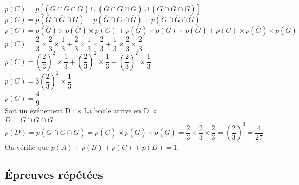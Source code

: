 $ p\left(C\right) = p\left[\left( \overline{G} \cap  \overline{G} \cap G \right) \cup \left( \overline{G} \cap G \cap \overline{G} \right) \cup \left( G \cap \overline{G} \cap \overline{G} \right)\right] $ \\

$ p\left(C\right) = p\left(\overline{G} \cap  \overline{G} \cap G \right) + p\left( \overline{G} \cap G \cap \overline{G} \right) + p\left( G \cap \overline{G} \cap \overline{G} \right) $ \\

$ p\left(C\right) = p\left(\overline{G}\right) \times p\left(\overline{G}\right) \times p\left(G\right) + p\left(\overline{G}\right) \times p\left(G\right) \times p\left(\overline{G}\right) + p\left(G\right) \times p\left(\overline{G}\right) \times p\left(\overline{G}\right) $ \\

$ p\left(C\right) = \dfrac{2}{3} \times \dfrac{2}{3} \times \dfrac{1}{3} +  \dfrac{2}{3} \times \dfrac{1}{3} \times \dfrac{2}{3} +  \dfrac{1}{3} \times \dfrac{2}{3} \times \dfrac{2}{3} $ \\

$ p\left(C\right) = \left(\dfrac{2}{3}\right)^2 \times \dfrac{1}{3} +  \left(\dfrac{2}{3}\right)^2 \times \dfrac{1}{3} +  \left(\dfrac{2}{3}\right)^2 \times \dfrac{1}{3} $ \\

$ p\left(C\right) = 3\left(\dfrac{2}{3}\right)^2 \times \dfrac{1}{3} $ \\

$ p\left(C\right) = \dfrac{4}{9} $ \\

Soit un événement D : « La boule arrive en D. » \\

$ D = \overline{G} \cap \overline{G} \cap \overline{G} $ \\

$ p\left(D\right) = p\left(\overline{G} \cap \overline{G} \cap \overline{G}\right) = p\left(\overline{G}\right) \times p\left(\overline{G}\right) \times p\left(\overline{G}\right) = \dfrac{2}{3} \times \dfrac{2}{3} \times \dfrac{2}{3} = \left(\dfrac{2}{3}\right)^3 = \dfrac{4}{27} $ \\

On vérifie que $p\left(A\right) + p\left(B\right) + p\left(C\right) + p\left(D\right) = 1$.

\newpage

\subsection{Épreuves répétées}

